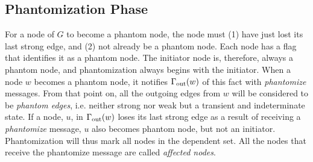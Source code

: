 \subsection{Phantomization Phase}
For a node of $G$ to become a phantom node, the node must
(1) have just lost its last strong edge, and
(2) not already be a phantom node.
Each node has a flag that identifies it as a phantom node.
The initiator node is, therefore, always a phantom node, and
phantomization always begins with the initiator.
When a node $w$ becomes a phantom node, it notifies
$\Gamma_{\rm out}(w)$ of this fact with {\em phantomize} messages. From that point on, all the outgoing edges from $w$ will
be considered to be {\em phantom edges}, i.e. neither strong nor weak but a transient and
indeterminate state. If a node, $u$, in $\Gamma_{\rm out}(w)$ loses its last strong edge
as a result of receiving a {\em phantomize} message, $u$ also becomes phantom node, %
but not an initiator.
Phantomization will thus
mark all nodes in the dependent set.
All the nodes that receive the phantomize message are called {\em affected nodes}.




